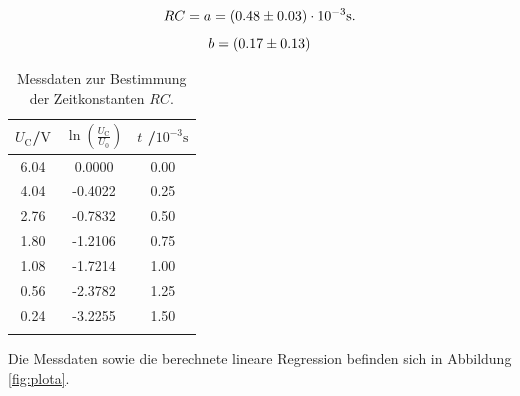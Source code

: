 \begin{equation*}
	\centering
	RC = a = (0.48 \pm 0.03) \cdot 10^{-3} \si{\second} .
\end{equation*}
\begin{equation*}
	\centering
	b = (0.17 \pm 0.13)
\end{equation*}
\begin{table}
	\caption{Messdaten zur Bestimmung der Zeitkonstanten $RC$.}
	\label{tab:taba}
	\centering
	\begin{tabular}{ccc}
		\toprule
		$U_\text{C}$/$\si{\volt}$ & $\ln{(\frac{U_\text{C}}{U_\text{0}})}$ & $t$ /$10^{-3}\si{\second}$ \\
		\midrule
		6.04                      & 0.0000                                 & 0.00                       \\
		4.04                      & -0.4022                                & 0.25                       \\
		2.76                      & -0.7832                                & 0.50                       \\
		1.80                      & -1.2106                                & 0.75                       \\
		1.08                      & -1.7214                                & 1.00                       \\
		0.56                      & -2.3782                                & 1.25                       \\
		0.24                      & -3.2255                                & 1.50                       \\                    \\
		\bottomrule
	\end{tabular}
\end{table}
Die Messdaten sowie die berechnete lineare Regression befinden sich in Abbildung \ref{fig:plota}.
